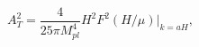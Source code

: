 \begin{equation}\label{tensoramplitude}
A_T^2 = \frac{4}{25 \pi M_{pl}^4} H^2 F^2(H/\mu)|_{k=aH},
\end{equation}

